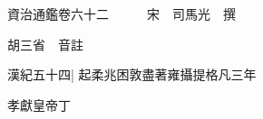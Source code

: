 






























































資治通鑑卷六十二　　　宋　司馬光　撰

胡三省　音註

漢紀五十四|{
	起柔兆困敦盡著雍攝提格凡三年}


孝獻皇帝丁

